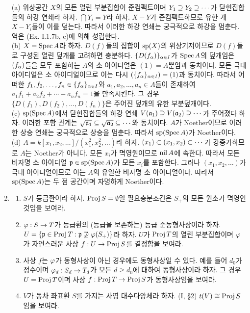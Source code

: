 \begin{enumerate}[label=\tb{2.\arabic*.},itemindent=0mm,itemsep=4mm]
\begin{enumerate}[label=(\alph*)]
	\end{enumerate}
	\sol (a) 위상공간 $X$의 모든 열린 부분집합이 준컴팩트이며 $Y_1\pseq Y_2\pseq\cdots$가 닫힌집합들의 하강 연쇄라 하자.
	$\bigcap Y_i=Y$라 하자. $X-Y$가 준컴팩트하므로 유한 개 $X-Y_i$들이 이를 덮는다.
	따라서 이러한 하강 연쇄는 궁극적으로 하강을 멈춘다. 역은 (Ex. I.1.7b, c)에 의해 성립한다.\\
	(b) $X=\Spec A$라 하자. $D(f)$들의 집합이 $\sp(X)$의 위상기저이므로 $D(f)$들로 구성된 열린 덮개를 고려하면 충분하다.
	$\{D(f_\al)\}_{\al\in I}$가 $\Spec A$의 덮개임은 $(f_\al)$들을 모두 포함하는 $A$의 소 아이디얼은 $(1)=A$뿐임과 동치이다.
	모든 극대 아이디얼은 소 아이디얼이므로 이는 다시 $(\{f_\al\}_{\al\in I})=(1)$과 동치이다.
	따라서 어떠한 $f_1,f_2,\ldots,f_n\in\{f_\al\}_{\al\in I}$와 $a_1,a_2,\ldots,a_n\in A$들이 존재하여
	$a_1f_1+a_2f_2+\cdots+a_nf_n=1$을 만족시킨다. 그 경우 $\{D(f_1),D(f_2),\ldots,D(f_n)\}$은 주어진 덮개의 유한 부분덮개이다.\\
	(c) $\sp(\Spec A)$에서 닫힌집합들의 하강 연쇄 $V(\mf a_1)\pseq V(\mf a_2)\pseq\cdots$가 주어졌다 하자.
	이러한 포함 관계는 $\sqrt{\mf a_1}\bseq\sqrt{\mf a_2}\bseq\cdots$와 동치이다.
	$A$가 Noether이므로 이러한 상승 연쇄는 궁극적으로 상승을 멈춘다. 따라서 $\sp(\Spec A)$가 Noether이다.\\
	(d) $A=k[x_1,x_2,\ldots]/(x_1^2,x_2^2,\ldots)$라 하자. $(x_1)\bs(x_1,x_2)\bs\cdots$가 강증가하므로 $A$는 Noether가 아니다.
	모든 $x_i$가 멱영원이므로 $\nil A$에 속한다. 따라서 모든 비자명 소 아이디얼 $\mf p\in\sp(\Spec A)$가 모든 $x_i$를 포함한다.
	그러나 $(x_1,x_2,\ldots)$가 극대 아이디얼이므로 이는 $A$의 유일한 비자명 소 아이디얼이다.
	따라서 $\sp(\Spec A)$는 두 점 공간이며 자명하게 Noether이다.
	\item \begin{enumerate}[label=(\alph*)]
	\item $S$가 등급환이라 하자. $\Proj S=\es$일 필요충분조건은 $S_+$의 모든 원소가 멱영인 것임을 보여라.
	\item $\ph:S\ra T$가 등급환의 (등급을 보존하는) 등급 준동형사상이라 하자.
	$U=\sx{\mf p\in\Proj T}{\mf p\not\pseq\ph(S_+)}$라 하자.
	$U$가 $\Proj T$의 열린 부분집합이며 $\ph$가 자연스러운 사상 $f:U\ra\Proj S$를 결정함을 보여라.
	\item 사상 $f$는 $\ph$가 동형사상이 아닌 경우에도 동형사상일 수 있다.
	예를 들어 $d_0$가 정수이며 $\ph_d:S_d\ra T_d$가 모든 $d\ge d_0$에 대하여 동형사상이라 하자.
	그 경우 $U=\Proj T$이며 사상 $f:\Proj T\ra\Proj S$가 동형사상임을 보여라.
	\item $V$가 동차 좌표환 $S$를 가지는 사영 대수다양체라 하자. (I, \S 2) $t(V)\cong\Proj S$임을 보여라.

\end{enumerate}
\end{enumerate}
